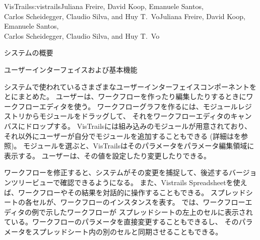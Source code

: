 \begin{aosachaptertoc}{VisTrails}{s:vistrails}{Juliana Freire, David Koop, Emanuele Santos, \\ Carlos Scheidegger, Claudio Silva, and Huy T.\ Vo}{Juliana Freire, David Koop, Emanuele Santos, \\ \hspace*{0.9cm} Carlos Scheidegger, Claudio Silva, and Huy T.\ Vo}
\begin{aosasect1}{システムの概要}
\begin{aosasect2}{ユーザーインターフェイスおよび基本機能}

システムで使われているさまざまなユーザーインターフェイスコンポーネントを
とにまとめた。
ユーザーは、ワークフローを作ったり編集したりするときにワークフローエディタを使う。
ワークフローグラフを作るには、モジュールレジストリからモジュールをドラッグして、
それをワークフローエディタのキャンバスにドロップする。
VisTrailsには組み込みのモジュールが用意されており、
それ以外にユーザーが自分でモジュールを追加することもできる
(詳細はを参照)。
モジュールを選ぶと、VisTrailsはそのパラメータをパラメータ編集領域に表示する。
ユーザーは、その値を設定したり変更したりできる。

ワークフローを修正すると、システムがその変更を捕捉して、後述するバージョンツリービューで確認できるようになる。
また、Vistrails Spreadsheetを使えば、ワークフローやその結果を対話的に操作することもできる。
スプレッドシートの各セルが、ワークフローのインスタンスを表す。
では、ワークフローエディタの例で示したワークフローが
スプレッドシートの左上のセルに表示されている。ワークフローのパラメータを直接変更することもできるし、
そのパラメータをスプレッドシート内の別のセルと同期させることもできる。


\end{aosasect2}
\end{aosasect1}
\end{aosachaptertoc}
